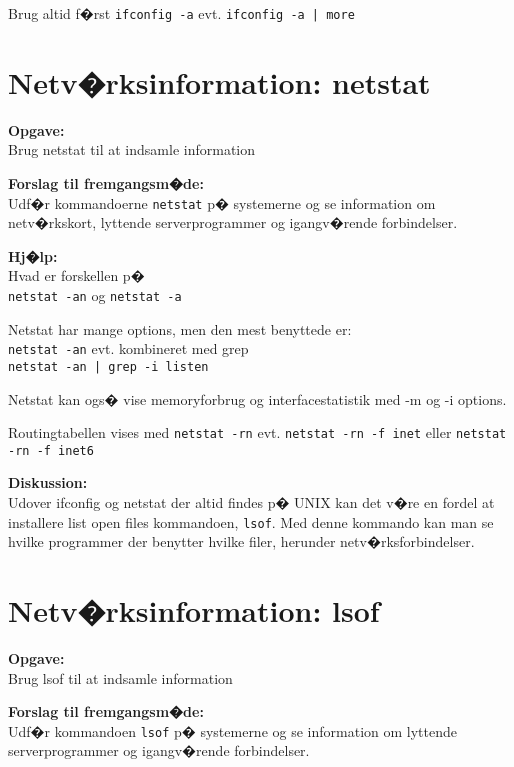\documentclass[a4paper,11pt,notitlepage]{oevelser}
\begin{document}
Brug altid f�rst \verb+ifconfig -a+ evt. \verb+ifconfig -a | more+



\chapter{Netv�rksinformation: netstat}
\label{ex:network-netstat}

{\bfseries Opgave:}\\
Brug netstat til at indsamle information

{\bfseries Forslag til fremgangsm�de:}\\
Udf�r kommandoerne \verb+netstat+ p� systemerne og
se information om netv�rkskort, lyttende serverprogrammer og
igangv�rende forbindelser.

{\bfseries Hj�lp:}\\
Hvad er forskellen p�\\
\verb+netstat -an+ og \verb+netstat -a+

Netstat har mange options, men den mest benyttede er:\\
\verb+netstat -an+ evt. kombineret med grep\\
\verb+netstat -an | grep -i listen+

Netstat kan ogs� vise memoryforbrug og interfacestatistik med -m og -i
options.

Routingtabellen vises med \verb+netstat -rn+ evt. \verb+netstat -rn -f inet+
eller \verb+netstat -rn -f inet6+


{\bfseries Diskussion:}\\
Udover ifconfig og netstat der altid findes p� UNIX kan det v�re en
fordel at installere list open files kommandoen, \verb+lsof+. Med
denne kommando kan man se hvilke programmer der benytter hvilke filer,
herunder netv�rksforbindelser.

\chapter{Netv�rksinformation: lsof}
\label{ex:network-lsof}

{\bfseries Opgave:}\\
Brug lsof til at indsamle information

{\bfseries Forslag til fremgangsm�de:}\\
Udf�r kommandoen \verb+lsof+ p� systemerne og
se information om lyttende serverprogrammer og
igangv�rende forbindelser.
\end{document}
